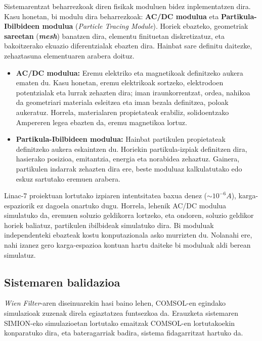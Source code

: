 \documentclass[12pt]{article}
\numberwithin{figure}{section}
\numberwithin{equation}{section}
\begin{document}
Sistemarentzat beharrezkoak diren fisikak moduluen bidez inplementatzen dira. Kasu honetan, bi modulu dira beharrezkoak: \textbf{AC/DC modulua} eta \textbf{Partikula-Ibilbideen modulua} (\textit{Particle Tracing Module}). Horiek ebazteko, geometriak \textbf{sareetan} (\textit{\textbf{mesh}}) banatzen dira, elementu finituetan diskretizatuz, eta bakoitzerako ekuazio diferentzialak ebazten dira. Hainbat sare definitu daitezke, zehaztasuna elementuaren arabera doituz.

\begin{itemize}
    \item \textbf{AC/DC modulua:}  Eremu elektriko eta magnetikoak definitzeko aukera ematen du. Kasu honetan, eremu elektrikoak sortzeko, elektrodoen potentzialak eta lurrak zehazten dira; iman iraunkorrentzat, ordea, nahikoa da geometriari materiala esleitzea eta iman bezala definitzea, poloak aukeratuz. Horrela, materialaren propietateak erabiliz, solidoentzako Ampereren legea ebazten da, eremu magnetikoa lortuz.\\
    \item \textbf{Partikula-Ibilbideen modulua:} Hainbat partikulen propietateak definitzeko aukera eskaintzen du. Horiekin partikula-izpiak definitzen dira, hasierako posizioa, emitantzia, energia eta norabidea zehaztuz. Gainera, partikulen indarrak zehazten dira ere, beste moduluaz kalkulatutako edo eskuz sartutako eremuen arabera.\\
\end{itemize} 

Linac-7 proiektuan lortutako izpiaren intentsitatea baxua denez ($\sim 10^{-6}A$), karga-espaziorik ez dagoela onartuko dugu. Horrela, lehenik AC/DC modulua simulatuko da, eremuen soluzio geldikorra lortzeko, eta ondoren, soluzio geldikor horiek baliatuz, partikulen ibilbideak simulatuko dira. Bi moduluak independenteki ebazteak kostu konputazionala asko murrizten du. Nolanahi ere, nahi izanez gero karga-espazioa kontuan hartu daiteke bi moduluak aldi berean simulatuz.

\subsection{Sistemaren balidazioa}
\textit{Wien Filter}-aren diseinuarekin hasi baino lehen, COMSOL-en egindako simulazioak zuzenak direla egiaztatzea funtsezkoa da. Erauzketa sistemaren SIMION-eko simulazioetan lortutako emaitzak \cite{bermejillo_seco_optical_2021} COMSOL-en lortutakoekin konparatuko dira, eta bateragarriak badira, sistema fidagarritzat hartuko da.\\
\end{document}
